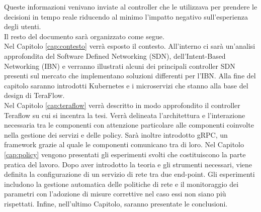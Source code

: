 Queste informazioni venivano inviate al controller che le utilizzava per prendere le decisioni in tempo reale riducendo al minimo l'impatto negativo sull'esperienza degli utenti. 
\\Il resto del documento sarà organizzato come segue.
\\Nel Capitolo \ref{cap:contesto} verrà esposto il contesto. All'interno ci sarà un'analisi approfondita del Software Defined Networking (SDN), dell'Intent-Based Networking (IBN)
e verranno illustrati alcuni dei principali controller SDN presenti sul mercato che implementano soluzioni differenti per l'IBN. Alla fine del capitolo saranno introdotti Kubernetes e i microservizi che stanno alla base del design di TeraFlow.
\\Nel Capitolo \ref{cap:teraflow} verrà descritto in modo approfondito il controller Teraflow su cui si incentra la tesi.
Verrà delineata l'architettura e l'interazione necessaria tra le componenti con attenzione particolare alle componenti coinvolte nella gestione dei servizi e delle policy.
Sarà inoltre introdotto gRPC, un framework grazie al quale le componenti comunicano tra di loro.
Nel Capitolo \ref{cap:policy} vengono presentati gli esperimenti svolti che costituiscono la parte pratica del lavoro.
Dopo aver introdotto la teoria e gli strumenti necessari, viene definita la configurazione di un servizio di rete tra due end-point. Gli esperimenti includono la gestione
automatica delle politiche di rete e il monitoraggio dei parametri con l'adozione di misure correttive nel caso essi non siano più rispettati.
Infine, nell'ultimo Capitolo, saranno presentate le conclusioni.
